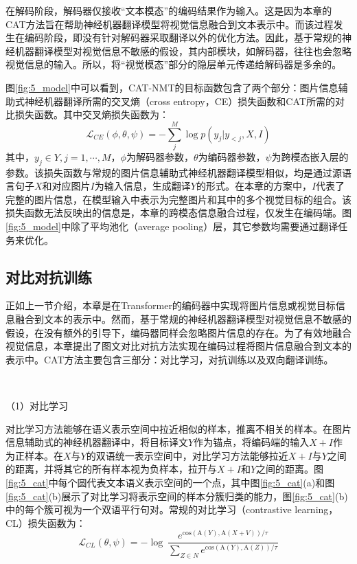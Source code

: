 在解码阶段，解码器仅接收“文本模态”的编码结果作为输入。这是因为本章的CAT方法旨在帮助神经机器翻译模型将视觉信息融合到文本表示中。而该过程发生在编码阶段，即没有针对解码器采取翻译以外的优化方法。因此，基于常规的神经机器翻译模型对视觉信息不敏感的假设，其内部模块，如解码器，往往也会忽略视觉信息的输入。所以，将“视觉模态”部分的隐层单元传递给解码器是多余的。

图\ref{fig:5_model}中可以看到，CAT-NMT的目标函数包含了两个部分：图片信息辅助式神经机器翻译所需的交叉熵（cross entropy，CE）损失函数和CAT所需的对比损失函数。其中交叉熵损失函数为：
\begin{equation}
    \mathcal{L}_{CE}(\phi, \theta, \psi)=-\sum_j^M \log p(y_j|y_{<j},X,I)
\label{eq:5_cross_entropy}
\end{equation}
其中，$y_j \in Y,j=1,\cdots,M$，$\phi$为解码器参数，$\theta$为编码器参数，$\psi$为跨模态嵌入层的参数。该损失函数与常规的图片信息辅助式神经机器翻译模型相似，均是通过源语言句子$X$和对应图片$I$为输入信息，生成翻译$Y$的形式。在本章的方案中，$I$代表了完整的图片信息，在模型输入中表示为完整图片和其中的多个视觉目标的组合。该损失函数无法反映出的信息是，本章的跨模态信息融合过程，仅发生在编码端。图\ref{fig:5_model}中除了平均池化（average pooling）层，其它参数均需要通过翻译任务来优化。

\subsection{对比对抗训练}
\label{sec:5_cat}
正如上一节介绍，本章是在Transformer的编码器中实现将图片信息或视觉目标信息融合到文本的表示中。然而，基于常规的神经机器翻译模型对视觉信息不敏感的假设，在没有额外的引导下，编码器同样会忽略图片信息的存在。为了有效地融合视觉信息，本章提出了图文对比对抗方法实现在编码过程将图片信息融合到文本的表示中。CAT方法主要包含三部分：对比学习，对抗训练以及双向翻译训练。

~



{\sffamily （1）对比学习}

对比学习方法能够在语义表示空间中拉近相似的样本，推离不相关的样本。在图片信息辅助式的神经机器翻译中，将目标译文$Y$作为锚点，将编码端的输入$X+I$作为正样本。在$X$与$Y$的双语统一表示空间中，对比学习方法能够拉近$X+I$与$Y$之间的距离，并将其它的所有样本视为负样本，拉开与$X+I$和$Y$之间的距离。图\ref{fig:5_cat}中每个圆代表文本语义表示空间的一个点，其中图\ref{fig:5_cat}(a)和图\ref{fig:5_cat}(b)展示了对比学习将表示空间的样本分簇归类的能力，图\ref{fig:5_cat}(b)中的每个簇可视为一个双语平行句对。常规的对比学习（contrastive learning，CL）损失函数为：
\begin{equation}
    \mathcal{L}_{CL}(\theta, \psi)=-\log\ \frac{e^{\mathrm{cos}(\mathrm{A}(Y),\mathrm{A}(X+V))/\tau}}{\sum_{Z\in N}e^{\mathrm{cos}(\mathrm{A}(Y),\mathrm{A}(Z))/\tau}}
    \label{eq:5_contrastive_learning}
\end{equation}

